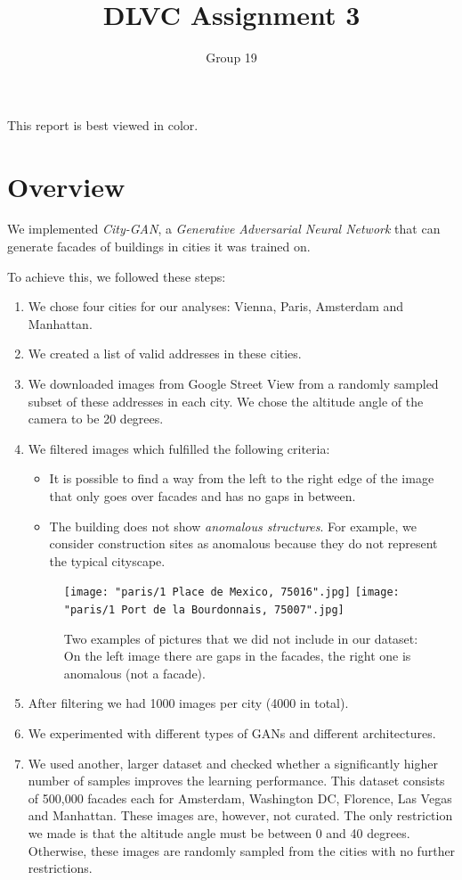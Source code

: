 \documentclass[a4paper]{article}
\author{Group 19}
\title{DLVC Assignment 3}
\begin{document}
\maketitle

This report is best viewed in color. 

\section{Overview}

We implemented \textit{City-GAN}, a \textit{Generative Adversarial Neural Network} \citep{goodfellow_generative_2014} that can generate facades of buildings in cities it was trained on. 

To achieve this, we followed these steps: 
\begin{enumerate}
\item We chose four cities for our analyses: Vienna, Paris, Amsterdam and Manhattan.
\item We created a list of valid addresses in these cities.
\item We downloaded images from Google Street View from a randomly sampled subset of these addresses in each city. We chose the altitude angle of the camera to be 20 degrees. 
\item We filtered images which fulfilled the following criteria:
\begin{itemize}
\item It is possible to find a way from the left to the right edge of the image that only goes over facades and has no gaps in between.
\item The building does not show \textit{anomalous structures}. For example, we consider construction sites as anomalous because they do not represent the typical cityscape. 

\end{itemize}
\begin{figure}[h]
\texttt{[image: "paris/1 Place de Mexico, 75016".jpg]}%
\hspace{0.02\columnwidth}%
\texttt{[image: "paris/1 Port de la Bourdonnais, 75007".jpg]}
\caption{Two examples of pictures that we did not include in our dataset: On the left image there are gaps in the facades, the right one is anomalous (not a facade).}
\label{fig:example_invalid}
\end{figure}

\item After filtering we had 1000 images per city (4000 in total). 
\item We experimented with different types of GANs and different architectures.
\item We used another, larger dataset \citep{zamir_repo_2019} and checked whether a significantly higher number of samples improves the learning performance. This dataset consists of 500,000 facades each for Amsterdam, Washington DC, Florence, Las Vegas and Manhattan. These images are, however, not curated. The only restriction we made is that the altitude angle must be between 0 and 40 degrees. Otherwise, these images are randomly sampled from the cities with no further restrictions. 
\end{enumerate}
\end{document}
